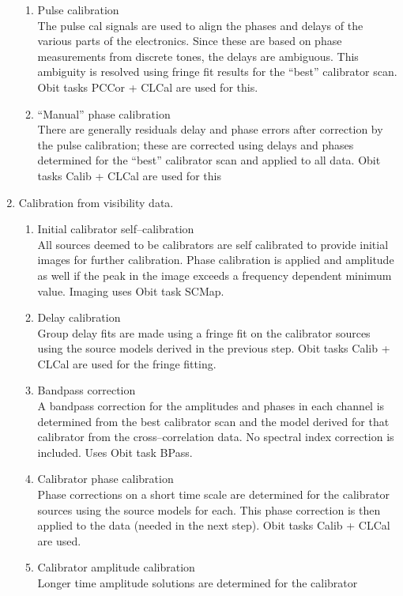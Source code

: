 \documentclass[11pt]{article}
\begin{document}
\begin{enumerate}
\begin {enumerate}
the highest average SNR.
Obit task Calib is  used for the fringe fitting.
\item Pulse calibration\\
The pulse cal signals are used to align the phases and delays of the
various parts of the electronics.
Since these are based on phase measurements from discrete tones, the
delays are ambiguous.
This ambiguity is resolved using fringe fit results for the ``best''
calibrator scan.
Obit tasks PCCor + CLCal are used for this.
\item ``Manual'' phase calibration\\
There are generally residuals delay and phase errors after correction
by the pulse calibration;  these are corrected using delays and phases
determined for the ``best'' calibrator scan and applied to all data.
Obit tasks Calib + CLCal are used for this
\end{enumerate}
\item Calibration from visibility data.
\begin {enumerate}
\item Initial calibrator self--calibration\\
All sources deemed to be calibrators are self calibrated to provide
initial images for further calibration.
Phase calibration is applied and amplitude as well if the peak in the
image exceeds a frequency dependent minimum value.
Imaging uses Obit task SCMap.
\item Delay calibration\\
Group delay fits are made using a fringe fit on the calibrator sources
using the source models derived in the previous step.
Obit tasks Calib  + CLCal are used for the fringe fitting.
\item Bandpass correction \\
A bandpass correction for the amplitudes and phases in each channel is
determined from the best calibrator scan and the model derived for
that calibrator from the cross--correlation data.
No spectral index correction is included.
Uses Obit task BPass.
\item Calibrator phase calibration \\
Phase corrections on a short time scale are determined for the
calibrator sources using the source models for each.
This phase correction is then applied to the data (needed in the next
step).
Obit tasks Calib  + CLCal are used.
\item Calibrator amplitude calibration \\
Longer time amplitude solutions are determined for the calibrator

\end{enumerate}
\end{enumerate}
\end{document}
